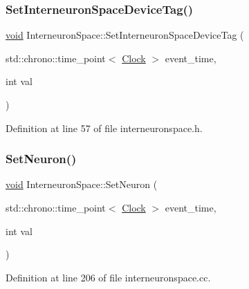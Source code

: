 \subsubsection{\texorpdfstring{Set\+Interneuron\+Space\+Device\+Tag()}{SetInterneuronSpaceDeviceTag()}}
{\footnotesize\ttfamily \mbox{\hyperlink{glad_8h_a950fc91edb4504f62f1c577bf4727c29}{void}} Interneuron\+Space\+::\+Set\+Interneuron\+Space\+Device\+Tag (\begin{DoxyParamCaption}\item[{std\+::chrono\+::time\+\_\+point$<$ \mbox{\hyperlink{universe_8h_a0ef8d951d1ca5ab3cfaf7ab4c7a6fd80}{Clock}} $>$}]{event\+\_\+time,  }\item[{int}]{val }\end{DoxyParamCaption})\hspace{0.3cm}{\ttfamily [inline]}}



Definition at line 57 of file interneuronspace.\+h.

\mbox{\label{class_interneuron_space_a50aaa97f71011dafb583dc432817f477}} 
\subsubsection{\texorpdfstring{Set\+Neuron()}{SetNeuron()}}
{\footnotesize\ttfamily \mbox{\hyperlink{glad_8h_a950fc91edb4504f62f1c577bf4727c29}{void}} Interneuron\+Space\+::\+Set\+Neuron (\begin{DoxyParamCaption}\item[{std\+::chrono\+::time\+\_\+point$<$ \mbox{\hyperlink{universe_8h_a0ef8d951d1ca5ab3cfaf7ab4c7a6fd80}{Clock}} $>$}]{event\+\_\+time,  }\item[{int}]{val }\end{DoxyParamCaption})}



Definition at line 206 of file interneuronspace.\+cc.

\mbox{\label{class_interneuron_space_ad6c1387daa261a3e8e1dba1402101d5c}} 
